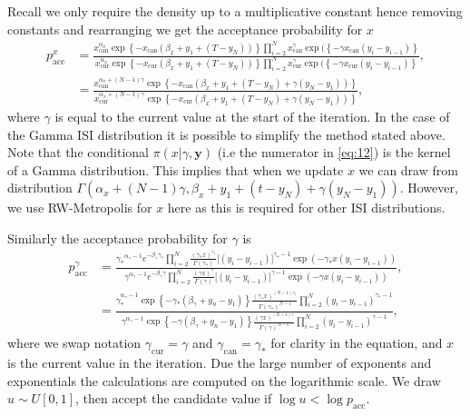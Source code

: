 \documentclass[../main.tex]{subfiles}
\begin{document}
Recall we only require the density up to a multiplicative constant hence removing constants and rearranging we get the acceptance probability for $x$
\begin{align}
p^x_{\mathrm{acc}} &= \frac{x_{\mathrm{can}}^{\alpha_x} \exp\left\{-x_{\mathrm{can}} \left(\beta_x + y_1 +(T-y_N) \right)  \right\} \prod^N_{i=2}  x_{\mathrm{can}}^\gamma \exp( \left\{- \gamma x_{\mathrm{can}}(y_i - y_{i-1}) \right\} }
{x_{\mathrm{cur}}^{\alpha_x} \exp\left\{-x_{\mathrm{cur}} \left(\beta_x + y_1 +(T-y_N) \right)  \right\} \prod^N_{i=2}  x_{\mathrm{cur}}^\gamma \exp( \left\{- \gamma x_{\mathrm{cur}}(y_i - y_{i-1}) \right\}}, \\
 &=  \frac{x_{\mathrm{can}}^{\alpha_x +(N-1)\gamma} \exp\left\{-x_{\mathrm{can}}\left(\beta_x + y_1 +(T-y_N)  + \gamma \left(y_N-y_1 \right) \right)  \right\} }
 {x_{\mathrm{cur}}^{\alpha_x +(N-1)\gamma} \exp\left\{-x_{\mathrm{cur}}\left(\beta_x + y_1 +(T-y_N)  + \gamma \left(y_N-y_1 \right) \right)  \right\}}, \label{eq:12}
\end{align}
where $\gamma$ is equal to the current value at the start of the iteration. In the case of the Gamma ISI distribution it is possible to simplify the method stated above. Note that the conditional $\pi(x | \gamma, \mathbf{y})$ (i.e the numerator in \eqref{eq:12}) is the kernel of a Gamma distribution. This implies that when we update $x$ we can draw from distribution $\Gamma \left( \alpha_x +(N-1)\gamma, \beta_x + y_1 +(t-y_N)  + \gamma \left(y_N-y_1 \right)  \right)$. However, we use  RW-Metropolis for $x$ here as this is required for other ISI distributions.

Similarly the acceptance probability for $\gamma$ is
\begin{align}
p^\gamma_{\mathrm{acc}} &= 
 \frac{{\gamma_*}^{\alpha_\gamma - 1} e ^{-\beta_\gamma {\gamma_*}} \prod^N_{i=2}  \frac{({\gamma_*} x)^{\gamma_*}}{\Gamma ( {\gamma _*} )} \big[(y_i - y_{i-1} ) \big]^{{\gamma _*} -1} \exp( - {\gamma _*} x(y_i - y_{i-1} )   )}
 {\gamma^{\alpha_\gamma - 1} e ^{-\beta_\gamma \gamma} \prod^N_{i=2}  \frac{(\gamma x)^\gamma}{\Gamma ( \gamma )} \big[(y_i - y_{i-1} ) \big]^{\gamma -1} \exp( - \gamma x(y_i - y_{i-1} )   )}, \\
 &=  \frac{\gamma_*^{\alpha_\gamma - 1} \exp \left\{ -\gamma_* \left( \beta_\gamma + y_n-y_1 \right) \right\} 
 \frac{(\gamma_* x)^{(N-1)\gamma_*}}{\Gamma ( \gamma_* )^{N-1}}
 \prod^N_{i=2}  (y_i - y_{i-1} )^{\gamma_* -1}}
 {\gamma^{\alpha_\gamma - 1} \exp \left\{ -\gamma \left( \beta_\gamma + y_n-y_1 \right) \right\} 
 \frac{(\gamma x)^{(N-1)\gamma}}{\Gamma ( \gamma )^{N-1}}
 \prod^N_{i=2}  (y_i - y_{i-1} )^{\gamma -1}},
\end{align}
where we swap notation $\gamma_{\mathrm{cur}} = \gamma$ and $\gamma_{\mathrm{can}} = \gamma_*$ for clarity in the equation, and $x$ is the current value in the iteration. Due the large number of exponents and exponentials the calculations are computed on the logarithmic scale.  We draw $u \sim U[0,1]$, then accept the candidate value if $\log u < \log p_{\mathrm{acc}}$.    
 
\end{document}
